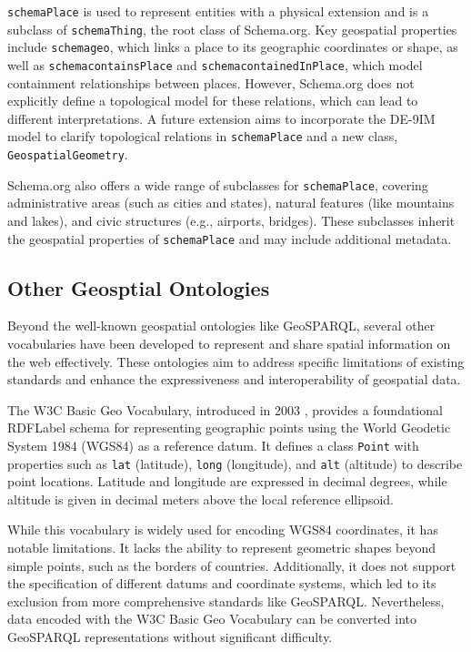\texttt{\gls{schema}Place} is used to represent entities with a physical extension and is a subclass of \texttt{\gls{schema}Thing}, the root class of Schema.org. Key geospatial properties include \texttt{\gls{schema}geo}, which links a place to its geographic coordinates or shape, as well as \texttt{\gls{schema}containsPlace} and \texttt{\gls{schema}containedInPlace}, which model containment relationships between places. However, Schema.org does not explicitly define a topological model for these relations, which can lead to different interpretations. A future extension aims to incorporate the DE-9IM model to clarify topological relations in \texttt{\gls{schema}Place} and a new class, \texttt{GeospatialGeometry}. 

Schema.org also offers a wide range of subclasses for \texttt{\gls{schema}Place}, covering administrative areas (such as cities and states), natural features (like mountains and lakes), and civic structures (e.g., airports, bridges). These subclasses inherit the geospatial properties of \texttt{\gls{schema}Place} and may include additional metadata. 


\subsection{Other Geosptial Ontologies}\label{III-subsec:otherGeospatialOntologies}

Beyond the well-known geospatial ontologies like GeoSPARQL, several other vocabularies have been developed to represent and share spatial information on the web effectively. These ontologies aim to address specific limitations of existing standards and enhance the expressiveness and interoperability of geospatial data.

The W3C Basic Geo Vocabulary, introduced in 2003 \cite{danbrickleyW3CBasicGeo2003}, provides a foundational \acrshort{RDFLabel} schema for representing geographic points using the World Geodetic System 1984 (WGS84) as a reference datum. It defines a class \texttt{Point} with properties such as \texttt{lat} (latitude), \texttt{long} (longitude), and \texttt{alt} (altitude) to describe point locations. Latitude and longitude are expressed in decimal degrees, while altitude is given in decimal meters above the local reference ellipsoid.

While this vocabulary is widely used for encoding WGS84 coordinates, it has notable limitations. It lacks the ability to represent geometric shapes beyond simple points, such as the borders of countries. Additionally, it does not support the specification of different datums and coordinate systems, which led to its exclusion from more comprehensive standards like GeoSPARQL. Nevertheless, data encoded with the W3C Basic Geo Vocabulary can be converted into GeoSPARQL representations without significant difficulty.

